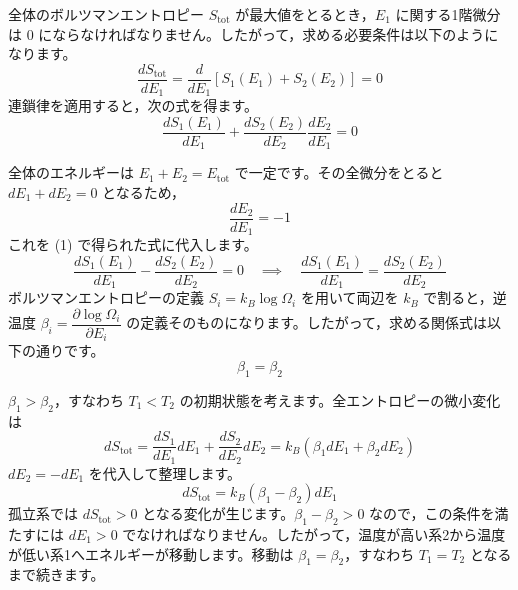 \solutionheading
\begin{solutionparts}

全体のボルツマンエントロピー $S_{\mathrm{tot}}$ が最大値をとるとき，$E_1$ に関する1階微分は 0 にならなければなりません。したがって，求める必要条件は以下のようになります。
\begin{equation*}
\frac{dS_{\mathrm{tot}}}{dE_1} = \frac{d}{dE_1} \left[ S_1(E_1) + S_2(E_2) \right] = 0
\end{equation*}
連鎖律を適用すると，次の式を得ます。
\begin{equation*}
\frac{dS_1(E_1)}{dE_1} + \frac{dS_2(E_2)}{dE_2} \frac{dE_2}{dE_1} = 0
\end{equation*}

全体のエネルギーは $E_1 + E_2 = E_{\mathrm{tot}}$ で一定です。その全微分をとると $dE_1 + dE_2 = 0$ となるため，
\begin{equation*}
\frac{dE_2}{dE_1} = -1
\end{equation*}
これを (1) で得られた式に代入します。
\begin{equation*}
\frac{dS_1(E_1)}{dE_1} - \frac{dS_2(E_2)}{dE_2} = 0 \quad \implies \quad \frac{dS_1(E_1)}{dE_1} = \frac{dS_2(E_2)}{dE_2}
\end{equation*}
ボルツマンエントロピーの定義 $S_i = k_B \log \Omega_i$ を用いて両辺を $k_B$ で割ると，逆温度 $\beta_i = \dfrac{\partial \log \Omega_i}{\partial E_i}$ の定義そのものになります。したがって，求める関係式は以下の通りです。
\begin{equation*}
\beta_1 = \beta_2
\end{equation*}

$\beta_1 > \beta_2$，すなわち $T_1 < T_2$ の初期状態を考えます。全エントロピーの微小変化は
\begin{equation*}
dS_{\mathrm{tot}} = \frac{dS_1}{dE_1} dE_1 + \frac{dS_2}{dE_2} dE_2 = k_B (\beta_1 dE_1 + \beta_2 dE_2)
\end{equation*}
$dE_2 = -dE_1$ を代入して整理します。
\begin{equation*}
dS_{\mathrm{tot}} = k_B (\beta_1 - \beta_2) dE_1
\end{equation*}
孤立系では $dS_{\mathrm{tot}} > 0$ となる変化が生じます。$\beta_1 - \beta_2 > 0$ なので，この条件を満たすには $dE_1 > 0$ でなければなりません。したがって，温度が高い系2から温度が低い系1へエネルギーが移動します。移動は $\beta_1 = \beta_2$，すなわち $T_1=T_2$ となるまで続きます。

\end{solutionparts}
